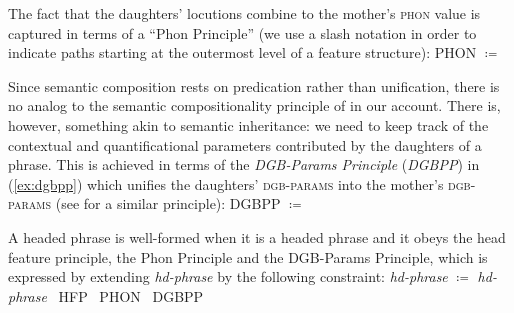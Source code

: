 \documentclass[output=paper
 	        ,biblatex
                ,babelshorthands
                ,newtxmath
                ,draftmode
                ,colorlinks, citecolor=brown
]{langscibook}
\begin{document}
The fact that the daughters' locutions combine to the mother's \textsc{phon} value is captured in terms of a \enquote{Phon Principle}  (we use a slash notation in order to indicate paths starting at the outermost level of a feature structure):
%
\ea 
PHON $\coloneqq$ \label{ex:phon-principle}
\z 

Since  semantic composition rests on predication rather than unification, there is no analog to the semantic compositionality principle of \citet{Sag:Wasow:Bender:2003} in our account.
%
There is, however, something akin to semantic inheritance: we need to keep track of the contextual and quantificational parameters contributed by the daughters of a phrase. 
%
This is achieved in terms of the \emph{DGB-Params Principle} (\emph{DGBPP}) in (\ref{ex:dgbpp}) which unifies the daughters' \textsc{dgb-params} into the mother's \textsc{dgb-params}  (see \citealt[126 \textit{et seq.}]{Ginzburg:2012}  for a similar principle): 
%
\ea \label{ex:dgbpp}
DGBPP $\coloneqq$ \label{ex:QPP} \par\medskip
{}
\z

A headed phrase is well-formed when it is a headed phrase and it obeys the head feature principle, the Phon Principle and the DGB-Params Principle, which is expressed by extending \emph{hd-phrase} by the following constraint:
%
\ea \label{ex:hd-phrase}
\emph{hd-phrase} $\coloneqq$ 
\emph{hd-phrase} \ttrmerge\ {HFP} \ttrmerge\  {PHON} \ttrmerge\ {DGBPP}
\z
\end{document}
